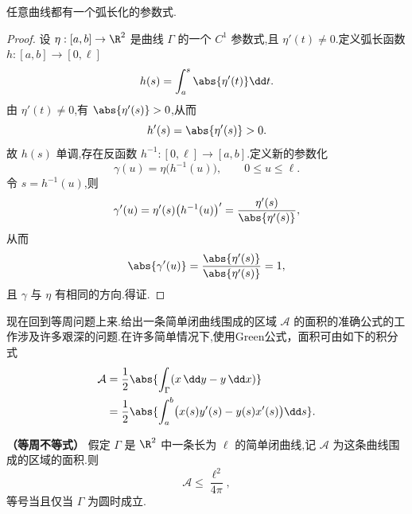 \begin{proposition}
	任意曲线都有一个弧长化的参数式.
\end{proposition}

\begin{proof}
	设 $\eta:[a,b]\to\R^2$ 是曲线 $\Gamma$ 的一个 $C^1$ 参数式,且 $\eta'(t)\neq0$.定义弧长函数 $h:[a,b]\to[0,\ell]$
	\[
	h(s)=\int_a^s\abs{\eta'(t)}\dd t.
	\]
	由 $\eta'(t)\neq0$,有 $\abs{\eta'(s)}>0$,从而
	\[
	h'(s)=\abs{\eta'(s)}>0.
	\]
	故 $h(s)$ 单调,存在反函数 $h^{-1}:[0,\ell]\to[a,b]$.定义新的参数化
	\[
	\gamma(u)=\eta\bigl(h^{-1}(u)\bigr),
	\qquad 0\leq u\leq\ell.
	\]
	令 $s=h^{-1}(u)$,则
	\[
	\gamma'(u)=\eta'(s)\bigl(h^{-1}(u)\bigr)'
	=\frac{\eta'(s)}{\abs{\eta'(s)}},
	\]
	从而
	\[
	\abs{\gamma'(u)}=\frac{\abs{\eta'(s)}}{\abs{\eta'(s)}}=1,
	\]
	且 $\gamma$ 与 $\eta$ 有相同的方向.得证.
\end{proof}

现在回到等周问题上来.给出一条简单闭曲线围成的区域 $\mathcal A$ 的面积的准确公式的工作涉及许多艰深的问题.在许多简单情况下,使用Green公式，面积可由如下的积分式
\begin{equation}\label{eq:area-formula}
	\begin{aligned}
		\mathcal A
		&=\frac12\abs{\int_\Gamma(x\,\dd y-y\,\dd x)}\\
		&=\frac12\abs{\int_a^b\bigl(x(s)y'(s)-y(s)x'(s)\bigr)\dd s}.
	\end{aligned}
\end{equation}

\begin{theorem}
	\textbf{（等周不等式）}
	假定 $\Gamma$ 是 $\R^2$ 中一条长为 $\ell$ 的简单闭曲线,记 $\mathcal A$ 为这条曲线围成的区域的面积.则
	\[
	\mathcal A\leq\frac{\ell^2}{4\pi},
	\]
	等号当且仅当 $\Gamma$ 为圆时成立.
\end{theorem}

